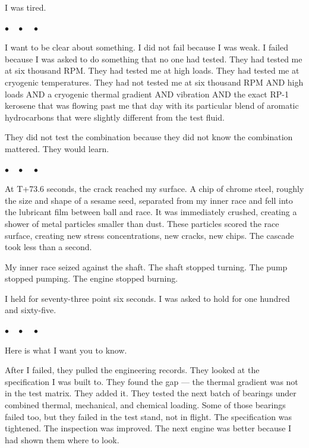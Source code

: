 \documentclass[12pt, letterpaper]{article}
\begin{document}
I was tired.

\begin{center}
$\bullet\quad\bullet\quad\bullet$
\end{center}

I want to be clear about something. I did not fail because I was weak. I failed because I was asked to do something that no one had tested. They had tested me at six thousand RPM. They had tested me at high loads. They had tested me at cryogenic temperatures. They had not tested me at six thousand RPM AND high loads AND a cryogenic thermal gradient AND vibration AND the exact RP-1 kerosene that was flowing past me that day with its particular blend of aromatic hydrocarbons that were slightly different from the test fluid.

They did not test the combination because they did not know the combination mattered. They would learn.

\begin{center}
$\bullet\quad\bullet\quad\bullet$
\end{center}

At T+73.6 seconds, the crack reached my surface. A chip of chrome steel, roughly the size and shape of a sesame seed, separated from my inner race and fell into the lubricant film between ball and race. It was immediately crushed, creating a shower of metal particles smaller than dust. These particles scored the race surface, creating new stress concentrations, new cracks, new chips. The cascade took less than a second.

My inner race seized against the shaft. The shaft stopped turning. The pump stopped pumping. The engine stopped burning.

I held for seventy-three point six seconds. I was asked to hold for one hundred and sixty-five.

\begin{center}
$\bullet\quad\bullet\quad\bullet$
\end{center}

Here is what I want you to know.

After I failed, they pulled the engineering records. They looked at the specification I was built to. They found the gap --- the thermal gradient was not in the test matrix. They added it. They tested the next batch of bearings under combined thermal, mechanical, and chemical loading. Some of those bearings failed too, but they failed in the test stand, not in flight. The specification was tightened. The inspection was improved. The next engine was better because I had shown them where to look.
\end{document}
